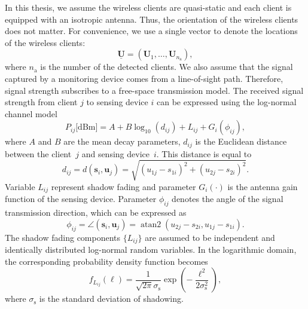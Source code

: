 In this thesis, we assume the wireless clients are quasi-static and each client is equipped with an isotropic antenna.
Thus, the orientation of the wireless clients does not matter.
For convenience, we use a single vector to denote the locations of the wireless clients:
\begin{equation}
\underline{\mathbf{U}} = (\mathbf{U}_1, \ldots, \mathbf{U}_{n_{\mathrm{a}}}) ,
\end{equation}
where $n_{\mathrm{a}}$ is the number of the detected clients.
We also assume that the signal captured by a monitoring device comes from a line-of-sight path.
Therefore, signal strength subscribes to a free-space transmission model.
The received signal strength from client $j$ to sensing device $i$ can be expressed using the log-normal channel model
\begin{equation} 
P_{ij} \text{[dBm]}
= A + B \log_{10}(d_{ij}) + L_{ij} + G_i (\phi_{ij}) ,
\end{equation}
where $A$ and $B$ are the mean decay parameters, $d_{ij}$ is the Euclidean distance between the client~$j$ and sensing device~$i$.
This distance is equal to
\begin{equation*}
d_{ij} = d(\mathbf{s}_i, \mathbf{u}_j)
= \sqrt{ (u_{1j} - s_{1i})^2 + (u_{2j} - s_{2i})^2 } .
\end{equation*}
Variable $L_{ij}$ represent shadow fading and parameter $G_i (\cdot)$ is the antenna gain function of the sensing device.
Parameter $\phi_{ij}$ denotes the angle of the signal transmission direction, which can be expressed as
\begin{equation*}
\phi_{ij} = \angle (\mathbf{s}_i, \mathbf{u}_j)
= \operatorname{atan2} ( u_{2j} - s_{2i}, u_{1j} - s_{1i} ) .
\end{equation*}
The shadow fading components $\{ L_{ij} \}$ are assumed to be independent and identically distributed log-normal random variables.
In the logarithmic domain, the corresponding probability density function becomes
\begin{equation} 
f_{L_{ij}} (\ell)
= \frac{1}{\sqrt{2 \pi} \sigma_{\mathrm{s}}} 
\exp \left( - \frac{\ell^2}{2 \sigma_{\mathrm{s}}^2} \right) ,
\end{equation}
where $\sigma_{\mathrm{s}}$ is the standard deviation of shadowing.

